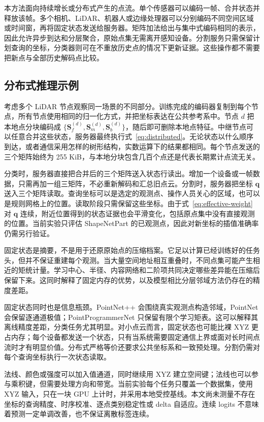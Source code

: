 \documentclass[UTF8,a4paper,11pt,fontset=windows]{ctexart}
\newcommand{\Sstate}{\mathbf{S}}
\begin{document}
本方法面向持续增长或分布式产生的点流。单个传感器可以编码一帧、合并状态并释放该帧。多个相机、LiDAR、机器人或边缘处理器可以分别编码不同空间区域或时间窗，再将固定状态发送给服务器。矩阵加法给出与集中式编码相同的表示，因此允许异步到达和分层聚合，原始点集无需离开感知设备。分割服务只需保留计划查询的坐标，分类器则可在不重放历史点的情况下更新证据。这些操作都不需要把新点与全部历史解码点比较。

\subsection{分布式推理示例}

考虑多个 LiDAR 节点观察同一场景的不同部分。训练完成的编码器复制到每个节点，所有节点使用相同的归一化方式，并把坐标表达在公共参考系中。节点 $d$ 把本地点分块编码成 $\{\Sstate_f^{(d)},\Sstate_m^{(d)},\Sstate_b^{(d)}\}$，随后即可删除本地点特征。中继节点可以任意合并这些状态，服务器最终执行式~\eqref{eq:distributed}。无论状态以什么顺序到达，或者通信采用怎样的树形结构，实数运算下的结果都相同。每个节点发送的三个矩阵始终为 255 KiB，与本地分块包含几百个点还是代表长期累计点流无关。

分类时，服务器直接把合并后的三个矩阵送入状态行读出。增加一个设备或一帧数据，只需再加一组三矩阵，不必重新解码和汇总旧点云。分割时，服务器把坐标 $\bm q$ 送入三个矩阵读取。查询坐标可以是选定的观测点、操作人员关心的区域，也可以是规则网格上的位置。读取阶段只需保留这些坐标。由于式~\eqref{eq:effective-weight} 对 $\bm q$ 连续，附近位置得到的状态证据也会平滑变化，包括原点集中没有直接观测的位置。当前实验只评估 ShapeNetPart 的已观测点，因此对新坐标的插值准确率仍需另行验证。

固定状态是摘要，不是用于还原原始点的压缩档案。它足以计算已经训练好的任务头，但并不保证重建每个观测。当大量空间地址相互重叠时，不同点集可能产生相近的矩统计量。学习中心、半径、内容网络和二阶项共同决定哪些差异能在压缩后保留下来。这同时解释了固定内存的优势，以及模型相比分层邻域方法仍存在的精度差距。

固定状态同时也是信息瓶颈。PointNet++ 会围绕真实观测点构造邻域，PointNet 会保留逐通道极值；PointProgrammerNet 只保留有限个学习矩表。这可以解释其离线精度差距，分类任务尤其明显。对小点云而言，固定状态也可能比裸 XYZ 更占内存；每个设备都发送一个状态，只有当系统需要固定通信上界或面对长时间点流时才有明显价值。分布式严格等价还要求公共坐标系和一致预处理。分割仍需对每个查询坐标执行一次状态读取。

法线、颜色或强度可以加入值通道，同时继续用 XYZ 建立空间键；法线也可以参与乘积键，但需要处理方向和带宽。当前实验每个任务只覆盖一个数据集，使用 XYZ 输入，只在一块 GPU 上计时，并采用本地受控基线。本文尚未测量不存在坐标的查询精度、时序校准、逐点类别稳定性或 delta 自适应。连续 logits 不意味着预测一定单调改善，也不保证离散标签连续。
\end{document}
